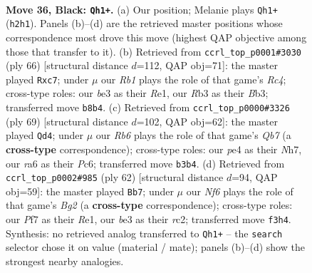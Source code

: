 \documentclass[11pt]{article}
\begin{document}
\clearpage

\begin{figure}[p]\centering
\begin{subfigure}{0.46\textwidth}\centering
\resizebox{\linewidth}{!}{%
\newchessgame
\chessboard[
  setfen={nr4k1/Q4pb1/R7/4p3/4P3/1r2Bn2/1P3RNq/1N3K2 b - - 3 36},
  showmover=false,
  pgfstyle=straightmove, color=movearrow, markmove={h2-h1}
]}
\caption{}
\end{subfigure}\hfill
\begin{subfigure}{0.46\textwidth}\centering
\resizebox{\linewidth}{!}{%
\newchessgame
\chessboard[
  setfen={r2r3k/2p4n/p5bQ/1q2p3/1PRbP3/1B4N1/5PK1/4R3 w - - 1 34},
  showmover=false,
  pgfstyle=straightmove, color=movearrow, markmove={c4-c7}
]}
\caption{}
\end{subfigure}
\\[4pt]
\begin{subfigure}{0.46\textwidth}\centering
\resizebox{\linewidth}{!}{%
\newchessgame
\chessboard[
  setfen={r6k/1p3Qnn/2p1r3/p7/6P1/P2BbRBP/1qP5/4R2K b - - 8 35},
  showmover=false,
  pgfstyle=straightmove, color=movearrow, markmove={b2-d4}
]}
\caption{}
\end{subfigure}\hfill
\begin{subfigure}{0.46\textwidth}\centering
\resizebox{\linewidth}{!}{%
\newchessgame
\chessboard[
  setfen={6k1/6pb/Qn1q3p/4N3/P2P4/6P1/2r2rB1/3RR1K1 w - - 1 32},
  showmover=false,
  pgfstyle=straightmove, color=movearrow, markmove={g2-b7}
]}
\caption{}
\end{subfigure}
\caption{\textbf{Move 36, Black: \texttt{Qh1+}.} (a) Our position; Melanie plays \texttt{Qh1+} (\texttt{h2h1}). Panels (b)--(d) are the retrieved master positions whose correspondence most drove this move (highest QAP objective among those that transfer to it). (b) Retrieved from \texttt{ccrl\_top\_p0001\#3030} (ply 66) [structural distance $d$=112, QAP obj=71]: the master played \texttt{Rxc7}; under $\mu$ our \emph{Rb1} plays the role of that game's \emph{Rc4}; cross-type roles: our \emph{b}e3 as their \emph{R}e1, our \emph{R}b3 as their \emph{B}b3; transferred move \texttt{b8b4}. (c) Retrieved from \texttt{ccrl\_top\_p0000\#3326} (ply 69) [structural distance $d$=102, QAP obj=62]: the master played \texttt{Qd4}; under $\mu$ our \emph{Rb6} plays the role of that game's \emph{Qb7} (a \textbf{cross-type} correspondence); cross-type roles: our \emph{p}e4 as their \emph{N}h7, our \emph{r}a6 as their \emph{P}c6; transferred move \texttt{b3b4}. (d) Retrieved from \texttt{ccrl\_top\_p0002\#985} (ply 62) [structural distance $d$=94, QAP obj=59]: the master played \texttt{Bb7}; under $\mu$ our \emph{Nf6} plays the role of that game's \emph{Bg2} (a \textbf{cross-type} correspondence); cross-type roles: our \emph{P}f7 as their \emph{R}e1, our \emph{b}e3 as their \emph{r}c2; transferred move \texttt{f3h4}. Synthesis: no retrieved analog transferred to \texttt{Qh1+} -- the \texttt{search} selector chose it on value (material / mate); panels (b)--(d) show the strongest nearby analogies.}
\label{fig:thought-m71}
\end{figure}
\end{document}
